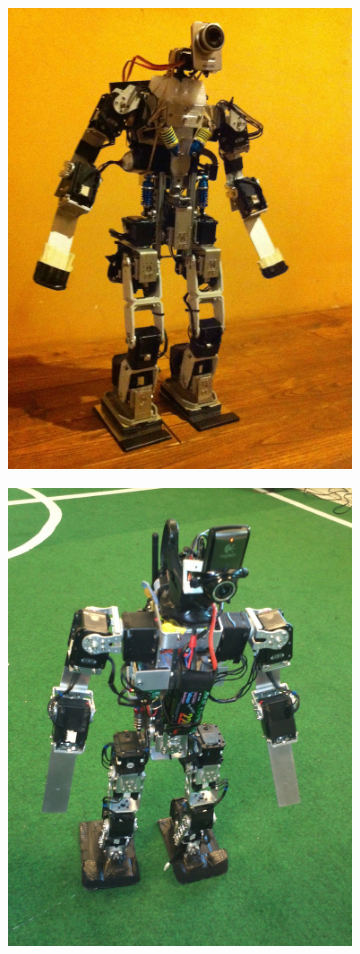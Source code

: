 \begin{figure}[htb]
    \centerfloat
    \begin{subfigure}{0.3\paperwidth}
        \centering
        \includegraphics[width=0.9\linewidth]{../media/sigmaban_1_0.jpg}
    \end{subfigure}
    \begin{subfigure}{0.3\paperwidth}
        \centering
        \includegraphics[width=0.9\linewidth]{../media/sigmaban_1_1.jpg}

\end{subfigure}
\end{figure}
